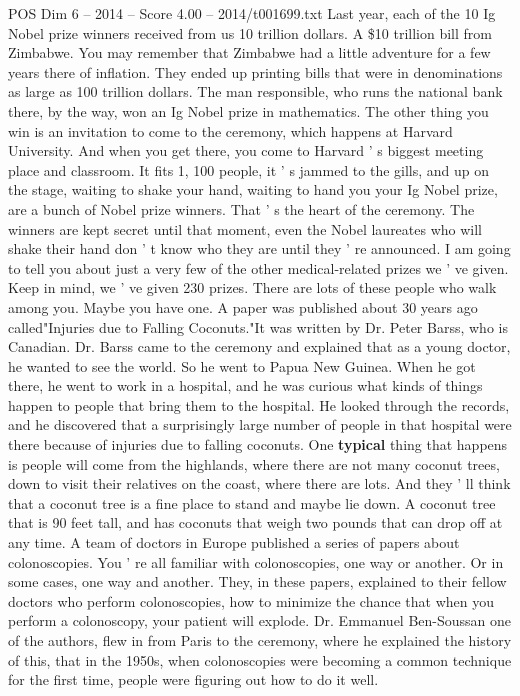 \begin{textsample}{POS Dim 6 – 2014 – Score 4.00 – 2014/t001699.txt}
Last year, each of the 10 Ig Nobel prize winners received from us 10 trillion dollars.
A \$10 trillion bill from Zimbabwe.
You may remember that Zimbabwe had a little adventure for a few years there of inflation.
They ended up printing bills that were in denominations as large as 100 trillion dollars.
The man responsible, who runs the national bank there, by the way, won an Ig Nobel prize in mathematics.
The other thing you win is an invitation to come to the ceremony, which happens at Harvard University.
And when you get there, you come to Harvard ' s biggest meeting place and classroom.
It fits 1, 100 people, it ' s jammed to the gills, and up on the stage, waiting to shake your hand, waiting to hand you your Ig Nobel prize, are a bunch of Nobel prize winners.
That ' s the heart of the ceremony.
The winners are kept secret until that moment, even the Nobel laureates who will shake their hand don ' t know who they are until they ' re announced.
I am going to tell you about just a very few of the other medical-related prizes we ' ve given.
Keep in mind, we ' ve given 230 prizes.
There are lots of these people who walk among you.
Maybe you have one.
A paper was published about 30 years ago called"Injuries due to Falling Coconuts."It was written by Dr.
Peter Barss, who is Canadian.
Dr.
Barss came to the ceremony and explained that as a young doctor, he wanted to see the world.
So he went to Papua New Guinea.
When he got there, he went to work in a hospital, and he was curious what kinds of things happen to people that bring them to the hospital.
He looked through the records, and he discovered that a surprisingly large number of people in that hospital were there because of injuries due to falling coconuts.
One \textbf{typical} thing that happens is people will come from the highlands, where there are not many coconut trees, down to visit their relatives on the coast, where there are lots.
And they ' ll think that a coconut tree is a fine place to stand and maybe lie down.
A coconut tree that is 90 feet tall, and has coconuts that weigh two pounds that can drop off at any time.
A team of doctors in Europe published a series of papers about colonoscopies.
You ' re all familiar with colonoscopies, one way or another.
Or in some cases, one way and another.
They, in these papers, explained to their fellow doctors who perform colonoscopies, how to minimize the chance that when you perform a colonoscopy, your patient will explode.
Dr.
Emmanuel Ben-Soussan one of the authors, flew in from Paris to the ceremony, where he explained the history of this, that in the 1950s, when colonoscopies were becoming a common technique for the first time, people were figuring out how to do it well.

\end{textsample}
